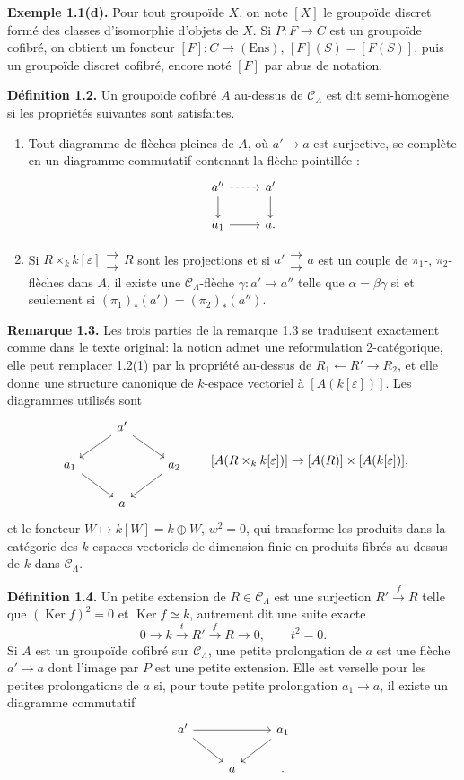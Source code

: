 \documentclass[11pt]{article}
\providecommand{\Ker}{\operatorname{Ker}}
\providecommand{\Ens}{\mathrm{Ens}}
\providecommand{\CL}{\mathcal C_\Lambda}
\begin{document}
\textbf{Exemple 1.1(d).} Pour tout groupo\"ide $X$, on note $[X]$ le groupo\"ide discret form\'e des classes d'isomorphie d'objets de $X$. Si $P:F\to C$ est un groupo\"ide cofibr\'e, on obtient un foncteur $[F]:C\to(\Ens)$, $[F](S)=[F(S)]$, puis un groupo\"ide discret cofibr\'e, encore not\'e $[F]$ par abus de notation.

\textbf{D\'efinition 1.2.} Un groupo\"ide cofibr\'e $A$ au-dessus de $\CL$ est dit semi-homog\`ene si les propri\'et\'es suivantes sont satisfaites.
\begin{enumerate}[label=(\arabic*)]
\item Tout diagramme de fl\`eches pleines de $A$, o\`u $a'\to a$ est surjective, se compl\`ete en un diagramme commutatif contenant la fl\`eche pointill\'ee :
\[
\begin{tikzcd}
 a'' \arrow[r,dashed] \arrow[d] & a' \arrow[d]\\
 a_1 \arrow[r] & a .
\end{tikzcd}
\]
\item Si $R\times_k k[\varepsilon]\mathrel{\substack{\longrightarrow\\[-.6ex]\longrightarrow}} R$ sont les projections et si $a'\mathrel{\substack{\longrightarrow\\[-.6ex]\longrightarrow}} a$ est un couple de $\pi_1$-, $\pi_2$-fl\`eches dans $A$, il existe une $\CL$-fl\`eche $\gamma:a'\to a''$ telle que $\alpha=\beta\gamma$ si et seulement si $(\pi_1)_*(a')=(\pi_2)_*(a'')$.
\end{enumerate}

\textbf{Remarque 1.3.} Les trois parties de la remarque 1.3 se traduisent exactement comme dans le texte original: la notion admet une reformulation 2-cat\'egorique, elle peut remplacer 1.2(1) par la propri\'et\'e au-dessus de $R_1\leftarrow R'\to R_2$, et elle donne une structure canonique de $k$-espace vectoriel \`a $[A(k[\varepsilon])]$. Les diagrammes utilis\'es sont
\[
\begin{tikzcd}
& a' \arrow[dl] \arrow[dr] &\\
a_1 \arrow[dr] && a_2 \arrow[dl]\\
& a &
\end{tikzcd}
\qquad
[A(R\times_k k[\varepsilon])]\to[A(R)]\times[A(k[\varepsilon])],
\]
et le foncteur $W\mapsto k[W]=k\oplus W$, $w^2=0$, qui transforme les produits dans la cat\'egorie des $k$-espaces vectoriels de dimension finie en produits fibr\'es au-dessus de $k$ dans $\CL$.

\textbf{D\'efinition 1.4.} Un petite extension de $R\in\CL$ est une surjection $R'\xrightarrow{f}R$ telle que $(\Ker f)^2=0$ et $\Ker f\simeq k$, autrement dit une suite exacte
\[
0\to k\xrightarrow{t}R'\xrightarrow{f}R\to0,
\qquad t^2=0.
\]
Si $A$ est un groupo\"ide cofibr\'e sur $\CL$, une petite prolongation de $a$ est une fl\`eche $a'\to a$ dont l'image par $P$ est une petite extension. Elle est verselle pour les petites prolongations de $a$ si, pour toute petite prolongation $a_1\to a$, il existe un diagramme commutatif
\[
\begin{tikzcd}
 a' \arrow[rr] \arrow[dr] && a_1 \arrow[dl]\\
& a &.
\end{tikzcd}
\]
\end{document}
